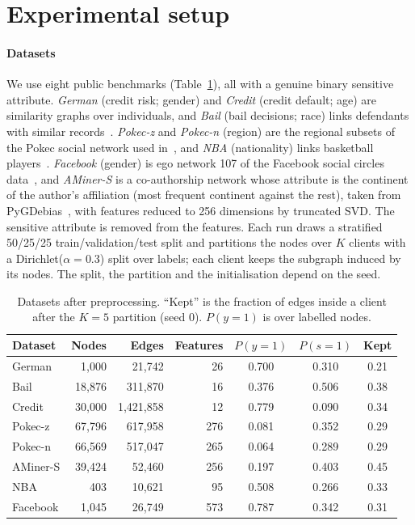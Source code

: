 \section{Experimental setup}\label{sec:setup}

\paragraph{Datasets}
We use eight public benchmarks (Table~\ref{tab:data}), all with a genuine binary sensitive attribute. \emph{German} (credit risk; gender) and \emph{Credit} (credit default; age) are similarity graphs over individuals, and \emph{Bail} (bail decisions; race) links defendants with similar records~\citep{agarwal2021towards}. \emph{Pokec-z} and \emph{Pokec-n} (region) are the regional subsets of the Pokec social network used in~\citep{dai2021say}, and \emph{NBA} (nationality) links basketball players~\citep{dai2021say}. \emph{Facebook} (gender) is ego network 107 of the Facebook social circles data~\citep{mcauley2012learning}, and \emph{AMiner-S} is a co-authorship network whose attribute is the continent of the author's affiliation (most frequent continent against the rest), taken from PyGDebias~\citep{dong2023fairness}, with features reduced to 256 dimensions by truncated SVD. The sensitive attribute is removed from the features. Each run draws a stratified 50/25/25 train/validation/test split and partitions the nodes over $K$ clients with a Dirichlet($\alpha=0.3$) split over labels; each client keeps the subgraph induced by its nodes. The split, the partition and the initialisation depend on the seed.

\begin{table}[tbp]
\centering
\footnotesize
\setlength{\tabcolsep}{4pt}
\caption{Datasets after preprocessing. ``Kept'' is the fraction of edges inside a client after the $K=5$ partition (seed 0). $P(y{=}1)$ is over labelled nodes.}\label{tab:data}
\begin{tabular}{lrrrccc}
\toprule
Dataset & Nodes & Edges & Features & $P(y{=}1)$ & $P(s{=}1)$ & Kept \\
\midrule
German   & 1{,}000  & 21{,}742      & 26  & 0.700 & 0.310 & 0.21 \\
Bail     & 18{,}876 & 311{,}870     & 16  & 0.376 & 0.506 & 0.38 \\
Credit   & 30{,}000 & 1{,}421{,}858 & 12  & 0.779 & 0.090 & 0.34 \\
Pokec-z  & 67{,}796 & 617{,}958     & 276 & 0.081 & 0.352 & 0.29 \\
Pokec-n  & 66{,}569 & 517{,}047     & 265 & 0.064 & 0.289 & 0.29 \\
AMiner-S & 39{,}424 & 52{,}460      & 256 & 0.197 & 0.403 & 0.45 \\
NBA      & 403      & 10{,}621      & 95  & 0.508 & 0.266 & 0.33 \\
Facebook & 1{,}045  & 26{,}749      & 573 & 0.787 & 0.342 & 0.31 \\
\bottomrule
\end{tabular}
\end{table}

